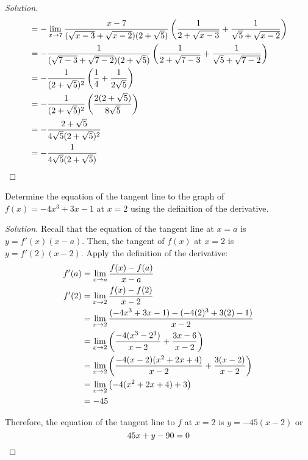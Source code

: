 \documentclass{agony}
\begin{document}
\begin{enumerate}[(a)]
\begin{proof}[Solution]
\begin{align*}
                  & = -\lim\limits_{x\to7}\frac{x-7}{(\sqrt{x-3}+\sqrt{x-2})(2+\sqrt{5})}
            \left( \frac{1}{2+\sqrt{x-3}} + \frac{1}{\sqrt{5}+\sqrt{x-2}} \right)                                                        \\
                  & = -\frac{1}{(\sqrt{7-3}+\sqrt{7-2})(2+\sqrt{5})}
            \left( \frac{1}{2+\sqrt{7-3}} + \frac{1}{\sqrt{5}+\sqrt{7-2}} \right)                                                        \\
                  & = -\frac{1}{(2+\sqrt{5})^2}\left( \frac{1}{4} + \frac{1}{2\sqrt{5}} \right)                                          \\
                  & = -\frac{1}{(2+\sqrt{5})^2}\left( \frac{2(2+\sqrt{5})}{8\sqrt{5}} \right)                                            \\
                  & = -\frac{2+\sqrt{5}}{4\sqrt{5}(2+\sqrt{5})^2}                                                                        \\
                  & = -\frac{1}{4\sqrt{5}(2+\sqrt{5})} \qedhere
          \end{align*}
        \end{proof}
\end{enumerate}

\question Determine the equation of the tangent line to the graph of $f(x)=-4x^3+3x-1$ at $x=2$ using the definition of the derivative.
\begin{proof}[Solution]
  Recall that the equation of the tangent line at $x=a$ is $y=f'(x)(x-a)$.
  Then, the tangent of $f(x)$ at $x=2$ is $y=f'(2)(x-2)$.
  Apply the definition of the derivative:
  \begin{align*}
    f'(a) & = \lim\limits_{x\to a} \frac{f(x)-f(a)}{x-a}                                             \\
    f'(2) & = \lim\limits_{x\to2} \frac{f(x)-f(2)}{x-2}                                             \\
          & = \lim\limits_{x\to2} \frac{(-4x^3 + 3x - 1) - (-4(2)^3 + 3(2) - 1)}{x-2}               \\
          & = \lim\limits_{x\to2} \left( \frac{-4(x^3-2^3)}{x-2} + \frac{3x-6}{x-2} \right)         \\
          & = \lim\limits_{x\to2} \left( \frac{-4(x-2)(x^2+2x+4)}{x-2} + \frac{3(x-2)}{x-2} \right) \\
          & = \lim\limits_{x\to2} \left( -4(x^2+2x+4) + 3 \right)                                   \\
          & = -45
  \end{align*}

  Therefore, the equation of the tangent line to $f$ at $x=2$ is $y=-45(x-2)$ or
  \[ 45x + y - 90 = 0 \qedhere \]
\end{proof}
\end{document}

